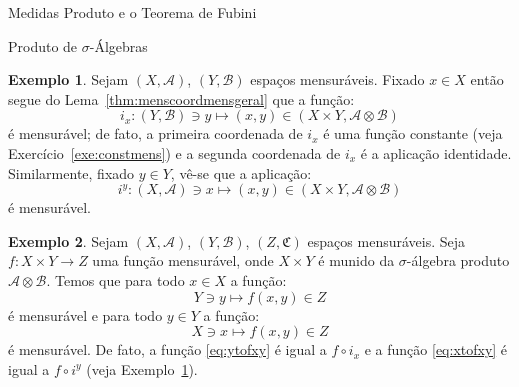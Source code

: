 \documentclass[oneside,final,11pt]{amsbook}
\theoremstyle{remark}\newtheorem{exercise}{Exercício}[chapter]
\theoremstyle{remark}\newtheorem{*exercise}[exercise]{\hbox to 0pt{\hskip 0pt minus 1fil*}Exercício}
\theoremstyle{definition}\newtheorem{exdefin}{Definição}[chapter]
\theoremstyle{plain}\newtheorem{teo}{Teorema}[section]
\theoremstyle{plain}\newtheorem{lem}[teo]{Lema}
\theoremstyle{plain}\newtheorem{prop}[teo]{Proposição}
\theoremstyle{plain}\newtheorem{cor}[teo]{Corolário}
\theoremstyle{definition}\newtheorem{defin}[teo]{Definição}
\theoremstyle{remark}\newtheorem{rem}[teo]{Observação}
\theoremstyle{definition}\newtheorem{notation}[teo]{Notação}
\theoremstyle{definition}\newtheorem{convention}[teo]{Convenção}
\theoremstyle{definition}\newtheorem{example}[teo]{Exemplo}
\numberwithin{section}{chapter}
\numberwithin{equation}{section}
\begin{document}
\begin{chapter}{Medidas Produto e o Teorema de Fubini}
\begin{section}{Produto de ${\sigma}$-Álgebras}
\begin{example}\label{exa:ixiy}
Sejam $(X,\mathcal A)$, $(Y,\mathcal B)$ espaços mensuráveis. Fixado $x\in X$ então segue do Lema~\ref{thm:menscoordmensgeral}
que a função:
\[i_x:(Y,\mathcal B)\ni y\longmapsto(x,y)\in(X\times Y,\mathcal A\otimes\mathcal B)\]
é mensurável; de fato, a primeira coordenada de $i_x$ é uma função constante (veja Exercício~\ref{exe:constmens})
e a segunda coordenada de $i_x$ é a aplicação identidade. Similarmente, fixado $y\in Y$, vê-se que a aplicação:
\[i^y:(X,\mathcal A)\ni x\longmapsto(x,y)\in(X\times Y,\mathcal A\otimes\mathcal B)\]
é mensurável.
\end{example}

\begin{example}\label{exa:fvarmens}
Sejam $(X,\mathcal A)$, $(Y,\mathcal B)$, $(Z,\mathfrak C)$ espaços mensuráveis. Seja
$f:X\times Y\to Z$ uma função mensurável, onde $X\times Y$ é munido da $\sigma$-álgebra produto $\mathcal A\otimes\mathcal B$.
Temos que para todo $x\in X$ a função:
\begin{equation}\label{eq:ytofxy}
Y\ni y\longmapsto f(x,y)\in Z
\end{equation}
é mensurável e para todo $y\in Y$ a função:
\begin{equation}\label{eq:xtofxy}
X\ni x\longmapsto f(x,y)\in Z
\end{equation}
é mensurável. De fato, a função \eqref{eq:ytofxy} é igual a $f\circ i_x$ e a função \eqref{eq:xtofxy} é igual
a $f\circ i^y$ (veja Exemplo~\ref{exa:ixiy}).
\end{example}


\end{section}
\end{chapter}
\end{document}
